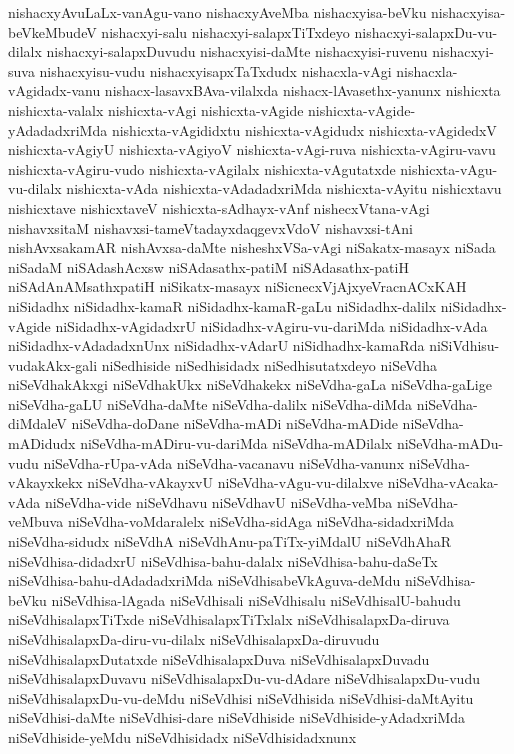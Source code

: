{nishacxyAvuLaLx-vanAgu-vano
nishacxyAveMba
nishacxyisa-beVku
nishacxyisa-beVkeMbudeV
nishacxyi-salu
nishacxyi-salapxTiTxdeyo
nishacxyi-salapxDu-vu-dilalx
nishacxyi-salapxDuvudu
nishacxyisi-daMte
nishacxyisi-ruvenu
nishacxyi-suva
nishacxyisu-vudu
nishacxyisapxTaTxdudx
nishacxla-vAgi
nishacxla-vAgidadx-vanu
nishacx-lasavxBAva-vilalxda
nishacx-lAvasethx-yanunx
nishicxta
nishicxta-valalx
nishicxta-vAgi
nishicxta-vAgide
nishicxta-vAgide-yAdadadxriMda
nishicxta-vAgididxtu
nishicxta-vAgidudx
nishicxta-vAgidedxV
nishicxta-vAgiyU
nishicxta-vAgiyoV
nishicxta-vAgi-ruva
nishicxta-vAgiru-vavu
nishicxta-vAgiru-vudo
nishicxta-vAgilalx
nishicxta-vAgutatxde
nishicxta-vAgu-vu-dilalx
nishicxta-vAda
nishicxta-vAdadadxriMda
nishicxta-vAyitu
nishicxtavu
nishicxtave
nishicxtaveV
nishicxta-sAdhayx-vAnf
nishecxVtana-vAgi
nishavxsitaM
nishavxsi-tameVtadayxdaqgevxVdoV
nishavxsi-tAni
nishAvxsakamAR
nishAvxsa-daMte
nisheshxVSa-vAgi
niSakatx-masayx
niSada
niSadaM
niSAdashAcxsw
niSAdasathx-patiM
niSAdasathx-patiH
niSAdAnAMsathxpatiH
niSikatx-masayx
niSicnecxVjAjxyeVracnACxKAH
niSidadhx
niSidadhx-kamaR
niSidadhx-kamaR-gaLu
niSidadhx-dalilx
niSidadhx-vAgide
niSidadhx-vAgidadxrU
niSidadhx-vAgiru-vu-dariMda
niSidadhx-vAda
niSidadhx-vAdadadxnUnx
niSidadhx-vAdarU
niSidhadhx-kamaRda
niSiVdhisu-vudakAkx-gali
niSedhiside
niSedhisidadx
niSedhisutatxdeyo
niSeVdha
niSeVdhakAkxgi
niSeVdhakUkx
niSeVdhakekx
niSeVdha-gaLa
niSeVdha-gaLige
niSeVdha-gaLU
niSeVdha-daMte
niSeVdha-dalilx
niSeVdha-diMda
niSeVdha-diMdaleV
niSeVdha-doDane
niSeVdha-mADi
niSeVdha-mADide
niSeVdha-mADidudx
niSeVdha-mADiru-vu-dariMda
niSeVdha-mADilalx
niSeVdha-mADu-vudu
niSeVdha-rUpa-vAda
niSeVdha-vacanavu
niSeVdha-vanunx
niSeVdha-vAkayxkekx
niSeVdha-vAkayxvU
niSeVdha-vAgu-vu-dilalxve
niSeVdha-vAcaka-vAda
niSeVdha-vide
niSeVdhavu
niSeVdhavU
niSeVdha-veMba
niSeVdha-veMbuva
niSeVdha-voMdaralelx
niSeVdha-sidAga
niSeVdha-sidadxriMda
niSeVdha-sidudx
niSeVdhA
niSeVdhAnu-paTiTx-yiMdalU
niSeVdhAhaR
niSeVdhisa-didadxrU
niSeVdhisa-bahu-dalalx
niSeVdhisa-bahu-daSeTx
niSeVdhisa-bahu-dAdadadxriMda
niSeVdhisabeVkAguva-deMdu
niSeVdhisa-beVku
niSeVdhisa-lAgada
niSeVdhisali
niSeVdhisalu
niSeVdhisalU-bahudu
niSeVdhisalapxTiTxde
niSeVdhisalapxTiTxlalx
niSeVdhisalapxDa-diruva
niSeVdhisalapxDa-diru-vu-dilalx
niSeVdhisalapxDa-diruvudu
niSeVdhisalapxDutatxde
niSeVdhisalapxDuva
niSeVdhisalapxDuvadu
niSeVdhisalapxDuvavu
niSeVdhisalapxDu-vu-dAdare
niSeVdhisalapxDu-vudu
niSeVdhisalapxDu-vu-deMdu
niSeVdhisi
niSeVdhisida
niSeVdhisi-daMtAyitu
niSeVdhisi-daMte
niSeVdhisi-dare
niSeVdhiside
niSeVdhiside-yAdadxriMda
niSeVdhiside-yeMdu
niSeVdhisidadx
niSeVdhisidadxnunx
}
